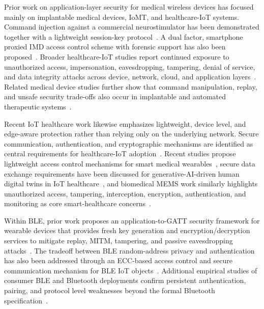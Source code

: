\documentclass[journal]{IEEEtran}
\begin{document}
Prior work on application-layer security for medical wireless devices has focused mainly on implantable medical devices, IoMT, and healthcare-IoT systems.
Command injection against a commercial neurostimulator has been demonstrated together with a lightweight session-key protocol~\cite{marin2018neurostimulator}.
A dual factor, smartphone proxied IMD access control scheme with forensic support has also been proposed~\cite{chi2018esafe}.
Broader healthcare-IoT studies report continued exposure to unauthorized access, impersonation, eavesdropping, tampering, denial of service, and data integrity attacks across device, network, cloud, and application layers~\cite{khatun2023hiotml,adil2024hciot,mrabet2020iotlayers}.
Related medical device studies further show that command manipulation, replay, and unsafe security trade-offs also occur in implantable and automated therapeutic systems~\cite{zheng2017wannadie}.

Recent IoT healthcare work likewise emphasizes lightweight, device level, and edge-aware protection rather than relying only on the underlying network.
Secure communication, authentication, and cryptographic mechanisms are identified as central requirements for healthcare-IoT adoption~\cite{adil2024hciot}.
Recent studies propose lightweight access control mechanisms for smart medical wearables~\cite{irshad2024fasmw}, secure data exchange requirements have been discussed for generative-AI-driven human digital twins in IoT healthcare~\cite{chen2024hdt}, and biomedical MEMS work similarly highlights unauthorized access, tampering, interception, encryption, authentication, and monitoring as core smart-healthcare concerns~\cite{jaime2023biomems}.

Within BLE, prior work proposes an application-to-GATT security framework for wearable devices that provides fresh key generation and encryption/decryption services to mitigate replay, MITM, tampering, and passive eavesdropping attacks~\cite{zhang2019bleframework}.
The tradeoff between BLE random-address privacy and authentication has also been addressed through an ECC-based access control and secure communication mechanism for BLE IoT objects~\cite{cha2017bleiot}.
Additional empirical studies of consumer BLE and Bluetooth deployments confirm persistent authentication, pairing, and protocol level weaknesses beyond the formal Bluetooth specification~\cite{peker2022heartrate,sevier2019ble,hassan2018btsurvey}.
\end{document}
